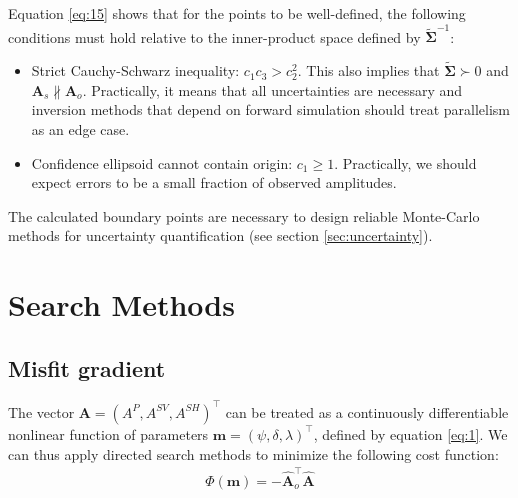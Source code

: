 \documentclass[preprint]{seismica}
\begin{document}
    Equation \ref{eq:15} shows that for the points to be well-defined, the following conditions
    must hold relative to the inner-product space defined by $\tilde{\bm{\Sigma}}^{-1}$:
    
    \begin{itemize}
      \item Strict Cauchy-Schwarz inequality: $c_1c_3 > c_2^2$. This also implies that
        $\tilde{\bm{\Sigma}} \succ 0$ and $\bm{A}_s \nparallel \bm{A}_o$. Practically, it means that all
        uncertainties are necessary and inversion methods that depend on forward simulation should
        treat parallelism as an edge case.
      \item Confidence ellipsoid cannot contain origin: $c_1 \geq 1$. Practically, we should expect
      errors to be a small fraction of observed amplitudes.
    \end{itemize}

    \noindent The calculated boundary points are necessary to design reliable Monte-Carlo methods for uncertainty
    quantification (see section \ref{sec:uncertainty}).
    



\section{Search Methods} \label{sec:algorithms}
  
  \subsection{Misfit gradient}
    The vector $\bm{A} = (A^P, A^{SV}, A^{SH})^\top$ can be treated as a continuously differentiable 
    nonlinear function of parameters $\bm{m} = (\psi, \delta, \lambda)^\top$, defined by equation 
    \ref{eq:1}. We can thus apply directed search methods to minimize the following cost function:
    \begin{align} \label{eq:16}
      \Phi(\bm{m}) = -\hat{\bm{A}}_o^\top \hat{\bm{A}}
    \end{align}
\end{document}
